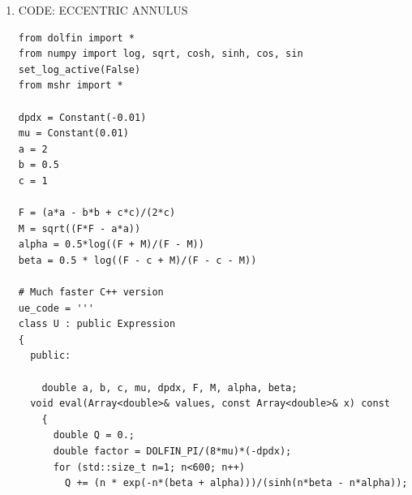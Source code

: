 \documentclass{article}
\begin{document}
\begin{enumerate}
\begin{verbatim}
    double a, b, mu, dpdx;

  void eval(Array<double>& values, const Array<double>& x) const
    {
      double u = 0.;
      double factor = 1.0/(2*mu)*(-dpdx)*(a*a*b*b)/(a*a + b*b);
      u = 1.0-(x[0]*x[0])/(a*a) - (x[1]*x[1])/(b*b);
      values[0] = u*factor;      
    }
};'''

# assigning the parametres into the c++ code?
u_c = Expression(ue_code)
u_c.a = float(a); u_c.b = float(b)
u_c.mu = float(mu(0)); u_c.dpdx = float(dpdx(0))

mesh = generate_mesh(Ellipse(Point(c),a ,b, 32), 32)

def main(N, degree=1):
  mesh = generate_mesh(Ellipse(Point(c),a ,b, N), N)
  V = FunctionSpace(mesh, 'CG', degree)
  u = TrialFunction(V)
  v = TestFunction(V)
  F = inner(grad(u), grad(v))*dx + 1/mu*dpdx*v*dx
  bc = DirichletBC(V, Constant(0), DomainBoundary())
  u_ = Function(V)
  solve(lhs(F) == rhs(F), u_, bcs=bc)

  #u_e = interpolate(u_exact(), V)
  u_e = interpolate(u_c, V)
  bc.apply(u_e.vector())
  u_error = errornorm(u_e, u_, degree_rise=0)

  if N==5 or N==20 or N==80:
    plot(u_, title="Numerical")
    plot(u_e, title="Exact")
    interactive()
  return u_error, mesh.hmin()

E = []; h = []; degree = 3
for n in [5, 10, 20, 40, 80]:
  ei, hi = main(n, degree=degree)
  E.append(ei)
  h.append(hi)

for i in range(1, len(E)):   
    r = ln(E[i]/E[i-1])/ln(h[i]/h[i-1])
    print "h=%2.2E E=%2.2E r=%.2f" %(h[i], E[i], r)

\end{verbatim}
\item{CODE: ECCENTRIC ANNULUS}
\begin{verbatim}
from dolfin import *
from numpy import log, sqrt, cosh, sinh, cos, sin
set_log_active(False)
from mshr import *

dpdx = Constant(-0.01)
mu = Constant(0.01)
a = 2
b = 0.5
c = 1

F = (a*a - b*b + c*c)/(2*c)
M = sqrt((F*F - a*a))
alpha = 0.5*log((F + M)/(F - M))
beta = 0.5 * log((F - c + M)/(F - c - M))

# Much faster C++ version
ue_code = '''
class U : public Expression
{
  public:

    double a, b, c, mu, dpdx, F, M, alpha, beta;
  void eval(Array<double>& values, const Array<double>& x) const
    {
      double Q = 0.;
      double factor = DOLFIN_PI/(8*mu)*(-dpdx);
      for (std::size_t n=1; n<600; n++)
        Q += (n * exp(-n*(beta + alpha)))/(sinh(n*beta - n*alpha));


\end{verbatim}
\end{enumerate}
\end{document}

